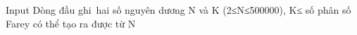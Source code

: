 Input
Dòng đầu ghi hai số nguyên dương N và K (2≤N≤500000), K≤ số phân số Farey có thể tạo ra được từ N